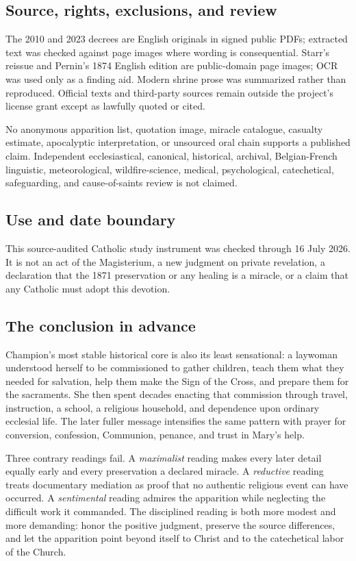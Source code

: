 {\subsection{Source, rights, exclusions, and review}

The 2010 and 2023 decrees are English originals in signed public PDFs; extracted text was checked against page images where wording is consequential. Starr's reissue and Pernin's 1874 English edition are public-domain page images; OCR was used only as a finding aid. Modern shrine prose was summarized rather than reproduced. Official texts and third-party sources remain outside the project's license grant except as lawfully quoted or cited.

No anonymous apparition list, quotation image, miracle catalogue, casualty estimate, apocalyptic interpretation, or unsourced oral chain supports a published claim. Independent ecclesiastical, canonical, historical, archival, Belgian-French linguistic, meteorological, wildfire-science, medical, psychological, catechetical, safeguarding, and cause-of-saints review is not claimed.

\subsection{Use and date boundary}

This source-audited Catholic study instrument was checked through 16 July 2026. It is not an act of the Magisterium, a new judgment on private revelation, a declaration that the 1871 preservation or any healing is a miracle, or a claim that any Catholic must adopt this devotion.
}

\subsection{The conclusion in advance}

Champion's most stable historical core is also its least sensational: a laywoman understood herself to be commissioned to gather children, teach them what they needed for salvation, help them make the Sign of the Cross, and prepare them for the sacraments. She then spent decades enacting that commission through travel, instruction, a school, a religious household, and dependence upon ordinary ecclesial life. The later fuller message intensifies the same pattern with prayer for conversion, confession, Communion, penance, and trust in Mary's help.

Three contrary readings fail. A \emph{maximalist} reading makes every later detail equally early and every preservation a declared miracle. A \emph{reductive} reading treats documentary mediation as proof that no authentic religious event can have occurred. A \emph{sentimental} reading admires the apparition while neglecting the difficult work it commanded. The disciplined reading is both more modest and more demanding: honor the positive judgment, preserve the source differences, and let the apparition point beyond itself to Christ and to the catechetical labor of the Church.
